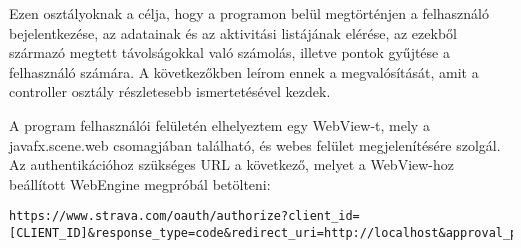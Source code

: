 Ezen osztályoknak a célja, hogy a programon belül megtörténjen a felhasználó bejelentkezése, az adatainak és az aktivitási listájának elérése, az ezekből származó megtett távolságokkal való számolás, illetve pontok gyűjtése a felhasználó számára. A következőkben leírom ennek a megvalósítását, amit a controller osztály részletesebb ismertetésével kezdek. 

A program felhasználói felületén elhelyeztem egy WebView-t, mely a javafx.scene.web csomagjában található, és webes felület megjelenítésére szolgál. Az authentikációhoz szükséges URL a következő, melyet a WebView-hoz beállított WebEngine megpróbál betölteni: 

\begin{verbatim}
https://www.strava.com/oauth/authorize?client_id=[CLIENT_ID]&response_type=code&redirect_uri=http://localhost&approval_prompt=force&scope=activity:read_all 
\end{verbatim}


